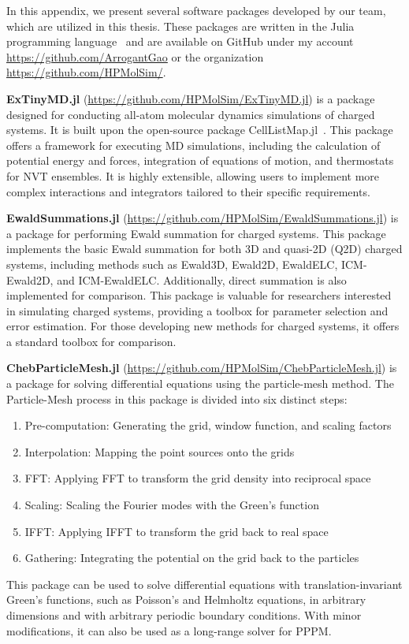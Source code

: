 In this appendix, we present several software packages developed by our team, which are utilized in this thesis. These packages are written in the Julia programming language~\cite{Julia-2017} and are available on GitHub under my account \url{https://github.com/ArrogantGao} or the organization \url{https://github.com/HPMolSim/}.

\textbf{ExTinyMD.jl} (\url{https://github.com/HPMolSim/ExTinyMD.jl}) is a package designed for conducting all-atom molecular dynamics simulations of charged systems. It is built upon the open-source package CellListMap.jl~\cite{celllistmap}. This package offers a framework for executing MD simulations, including the calculation of potential energy and forces, integration of equations of motion, and thermostats for NVT ensembles. It is highly extensible, allowing users to implement more complex interactions and integrators tailored to their specific requirements.

\textbf{EwaldSummations.jl} (\url{https://github.com/HPMolSim/EwaldSummations.jl}) is a package for performing Ewald summation for charged systems. This package implements the basic Ewald summation for both 3D and quasi-2D (Q2D) charged systems, including methods such as Ewald3D, Ewald2D, EwaldELC, ICM-Ewald2D, and ICM-EwaldELC. Additionally, direct summation is also implemented for comparison. This package is valuable for researchers interested in simulating charged systems, providing a toolbox for parameter selection and error estimation. For those developing new methods for charged systems, it offers a standard toolbox for comparison.

\textbf{ChebParticleMesh.jl} (\url{https://github.com/HPMolSim/ChebParticleMesh.jl}) is a package for solving differential equations using the particle-mesh method. The Particle-Mesh process in this package is divided into six distinct steps:
\begin{enumerate}
    \item Pre-computation: Generating the grid, window function, and scaling factors
    \item Interpolation: Mapping the point sources onto the grids
    \item FFT: Applying FFT to transform the grid density into reciprocal space
    \item Scaling: Scaling the Fourier modes with the Green's function
    \item IFFT: Applying IFFT to transform the grid back to real space
    \item Gathering: Integrating the potential on the grid back to the particles
\end{enumerate}
This package can be used to solve differential equations with translation-invariant Green's functions, such as Poisson's and Helmholtz equations, in arbitrary dimensions and with arbitrary periodic boundary conditions. With minor modifications, it can also be used as a long-range solver for PPPM.
